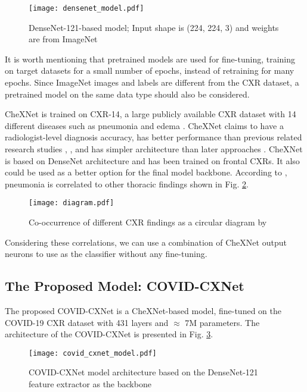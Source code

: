 \documentclass{article}
\begin{document}
\begin{figure}[H]
    \centering
    \texttt{[image: densenet\_model.pdf]}
    \caption{DenseNet-121-based model; Input shape is (224, 224, 3) and weights are from ImageNet}
    \label{fig:densenet}
\end{figure}

\noindent It is worth mentioning that pretrained models are used for fine-tuning, training on target datasets for a small number of epochs, instead of retraining for many epochs. Since ImageNet images and labels are different from the CXR dataset, a pretrained model on the same data type should also be considered.

CheXNet is trained on CXR-14, a large publicly available CXR dataset with 14 different diseases such as pneumonia and edema \cite{rajpurkar2017chexnet}. CheXNet claims to have a radiologist-level diagnosis accuracy, has better performance than previous related research studies \cite{wang2017chestx}, \cite{yao2017learning}, and has simpler architecture than later approaches \cite{ranjan2018jointly}. CheXNet is based on DenseNet architecture and has been trained on frontal CXRs. It also could be used as a better option for the final model backbone. According to \cite{wang2017chestx}, pneumonia is correlated to other thoracic findings shown in Fig. \ref{fig:thoracic_map}.

\begin{figure}[H]
    \centering
    \texttt{[image: diagram.pdf]}
    \caption{Co-occurrence of different CXR findings as a circular diagram by \cite{wang2017chestx}}
    \label{fig:thoracic_map}
\end{figure}

\noindent Considering these correlations, we can use a combination of CheXNet output neurons to use as the classifier without any fine-tuning.

\subsection{The Proposed Model: COVID-CXNet}
The proposed COVID-CXNet is a CheXNet-based model, fine-tuned on the COVID-19 CXR dataset with 431 layers and $\approx$ 7M parameters. The architecture of the COVID-CXNet is presented in Fig. \ref{fig:cxnet}.

\begin{figure}[H]
    \centering
    \texttt{[image: covid\_cxnet\_model.pdf]}
    \caption{COVID-CXNet model architecture based on the DenseNet-121 feature extractor as the backbone}
    \label{fig:cxnet}
\end{figure}
\end{document}
